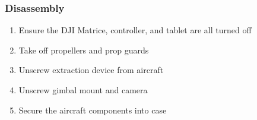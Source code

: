 \subsubsection{Disassembly}
\begin{enumerate}
\setlength{\itemsep}{0em}
\setlength{\parskip}{0em}
\item Ensure the DJI Matrice, controller, and tablet are all turned off
\item Take off propellers and prop guards 
\item Unscrew extraction device from aircraft
\item Unscrew gimbal mount and camera
\item Secure the aircraft components into case
\end{enumerate}